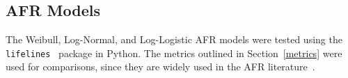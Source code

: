 \subsection{AFR Models}
The Weibull, Log-Normal, and Log-Logistic AFR models were tested using the \texttt{lifelines}~\cite{lifelines} package in Python. The metrics outlined in Section~\ref{metrics} were used for comparisons, since they are widely used in the AFR literature~\cite{aft_models}.
